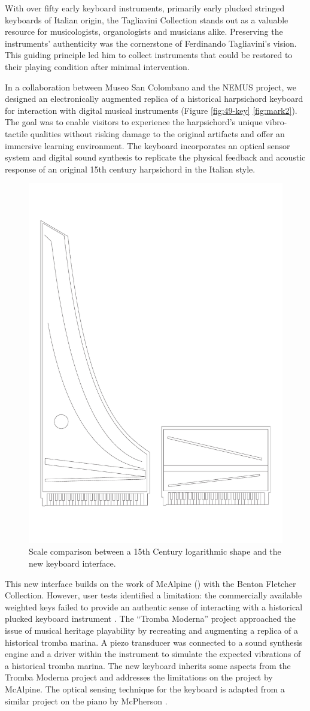 With over fifty early keyboard instruments, primarily early plucked stringed keyboards of Italian origin, the Tagliavini Collection stands out as a valuable resource for musicologists, organologists and musicians alike. Preserving the instruments' authenticity was the cornerstone of Ferdinando Tagliavini’s vision. This guiding principle led him to collect instruments that could be restored to their playing condition after minimal intervention. 

In a collaboration between Museo San Colombano and the NEMUS project, we designed an electronically augmented replica of a historical harpsichord keyboard for interaction with digital musical instruments (Figure \ref{fig:49-key} \ref{fig:mark2}). The goal was to enable visitors to experience the harpsichord’s unique vibro-tactile qualities without risking damage to the original artifacts and offer an immersive learning environment. The keyboard incorporates an optical sensor system and digital sound synthesis to replicate the physical feedback and acoustic response of an original 15th century harpsichord in the Italian style.
\begin{figure}
    \centering
    \includegraphics[width=0.5\linewidth]{img/outline_compare.pdf}
    \caption{Scale comparison between a 15th Century logarithmic shape and the new keyboard interface.}
    \label{fig:log-harp-comp}
\end{figure}

This new interface builds on the work of McAlpine (\citeyear{mcalpine_sampling_2014}) with the Benton Fletcher Collection. However, user tests identified a limitation: the commercially available weighted keys failed to provide an authentic sense of interacting with a historical plucked keyboard instrument \cite{mcalpine_sampling_2014}. The ``Tromba Moderna'' project \cite{baldwin_tromba_2016} approached the issue of musical heritage playability by recreating and augmenting a replica of a historical tromba marina. A piezo transducer was connected to a sound synthesis engine and a driver within the instrument to simulate the expected vibrations of a historical tromba marina. The new keyboard inherits some aspects from the Tromba Moderna project and addresses the limitations on the project by McAlpine. The optical sensing technique for the keyboard is adapted from a similar project on the piano by McPherson \cite{mcpherson_portable_2013}.

